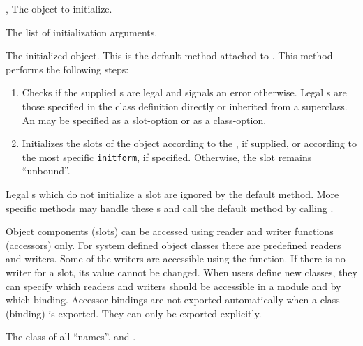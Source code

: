 \begin{optDefinition}
%
\begin{specargs}
    \item[\scref{object}, \classref{object}] The object to initialize.
    \item[\scref{initlist}] The list of initialization arguments.
\end{specargs}
%
\result%
The initialized object.
%
\remarks%
This is the default method attached to .  This method
performs the following steps:

\begin{enumerate}
    \item Checks if the supplied s are legal and signals an error
    otherwise. Legal s are those specified in the class
    definition directly or inherited from a superclass.  An  may
    be specified as a slot-option or as a class-option.

    \item Initializes the slots of the object according to the ,
    if supplied, or according to the most specific {\tt initform}, if specified.
    Otherwise, the slot remains ``unbound''.
\end{enumerate}
%
Legal s which do not initialize a slot are ignored by the default
 method.  More specific methods may handle these
s and call the default method by calling
.
%
\end{optDefinition}

%
\begin{optDefinition}
Object components (slots) can be accessed using reader and writer functions
(accessors) only. For system defined object classes there are predefined readers
and writers. Some of the writers are accessible using the 
function. If there is no writer for a slot, its value cannot be changed. When
users define new classes, they can specify which readers and writers should be
accessible in a module and by which binding.  Accessor bindings are not exported
automatically when a class (binding) is exported. They can only be exported
explicitly.

%
%
The class of all ``names''.
%
\seealso%
 and .
%
\end{optDefinition}
